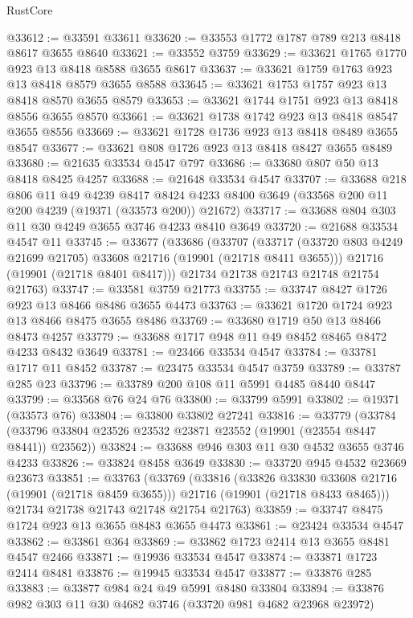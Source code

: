 \begin{lexlean}{RustCore}
\begin{coremodule}
@33612 := @33591 @33611
@33620 := @33553 @1772 @1787 @789 @213 @8418 @8617 @3655 @8640
@33621 := @33552 @3759
@33629 := @33621 @1765 @1770 @923 @13 @8418 @8588 @3655 @8617
@33637 := @33621 @1759 @1763 @923 @13 @8418 @8579 @3655 @8588
@33645 := @33621 @1753 @1757 @923 @13 @8418 @8570 @3655 @8579
@33653 := @33621 @1744 @1751 @923 @13 @8418 @8556 @3655 @8570
@33661 := @33621 @1738 @1742 @923 @13 @8418 @8547 @3655 @8556
@33669 := @33621 @1728 @1736 @923 @13 @8418 @8489 @3655 @8547
@33677 := @33621 @808 @1726 @923 @13 @8418 @8427 @3655 @8489
@33680 := @21635 @33534 @4547 @797
@33686 := @33680 @807 @50 @13 @8418 @8425 @4257
@33688 := @21648 @33534 @4547
@33707 := @33688
    @218
    @806
    @11
    @49
    @4239
    @8417
    @8424
    @4233
    @8400
    @3649
    (@33568 @200 @11 @200 @4239 (@19371 (@33573 @200)) @21672)
@33717 := @33688 @804 @303 @11 @30 @4249 @3655 @3746 @4233 @8410 @3649
@33720 := @21688 @33534 @4547 @11
@33745 := @33677
    (@33686
      (@33707
        (@33717 (@33720 @803 @4249 @21699 @21705) @33608 @21716 (@19901 (@21718 @8411 @3655)))
        @21716
        (@19901 (@21718 @8401 @8417)))
      @21734
      @21738
      @21743
      @21748
      @21754
      @21763)
@33747 := @33581 @3759 @21773
@33755 := @33747 @8427 @1726 @923 @13 @8466 @8486 @3655 @4473
@33763 := @33621 @1720 @1724 @923 @13 @8466 @8475 @3655 @8486
@33769 := @33680 @1719 @50 @13 @8466 @8473 @4257
@33779 := @33688 @1717 @948 @11 @49 @8452 @8465 @8472 @4233 @8432 @3649
@33781 := @23466 @33534 @4547
@33784 := @33781 @1717 @11 @8452
@33787 := @23475 @33534 @4547 @3759
@33789 := @33787 @285 @23
@33796 := @33789 @200 @108 @11 @5991 @4485 @8440 @8447
@33799 := @33568 @76 @24 @76
@33800 := @33799 @5991
@33802 := @19371 (@33573 @76)
@33804 := @33800 @33802 @27241
@33816 := @33779
    (@33784 (@33796 @33804 @23526 @23532 @23871 @23552 (@19901 (@23554 @8447 @8441)) @23562))
@33824 := @33688 @946 @303 @11 @30 @4532 @3655 @3746 @4233
@33826 := @33824 @8458 @3649
@33830 := @33720 @945 @4532 @23669 @23673
@33851 := @33763
    (@33769
      (@33816
        (@33826 @33830 @33608 @21716 (@19901 (@21718 @8459 @3655)))
        @21716
        (@19901 (@21718 @8433 @8465)))
      @21734
      @21738
      @21743
      @21748
      @21754
      @21763)
@33859 := @33747 @8475 @1724 @923 @13 @3655 @8483 @3655 @4473
@33861 := @23424 @33534 @4547
@33862 := @33861 @364
@33869 := @33862 @1723 @2414 @13 @3655 @8481 @4547 @2466
@33871 := @19936 @33534 @4547
@33874 := @33871 @1723 @2414 @8481
@33876 := @19945 @33534 @4547
@33877 := @33876 @285
@33883 := @33877 @984 @24 @49 @5991 @8480 @33804
@33894 := @33876 @982 @303 @11 @30 @4682 @3746 (@33720 @981 @4682 @23968 @23972)

\end{coremodule}
\end{lexlean}
